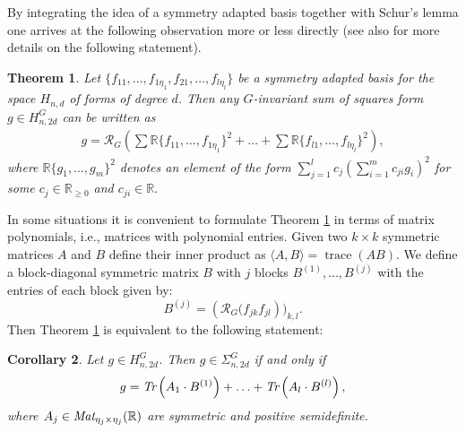 \documentclass[11pt,a4paper]{amsart}
\numberwithin{equation}{section}
\newtheorem{thm}{Theorem}
\newtheorem{cor}[thm]{Corollary}
\theoremstyle{definition}
\newcommand{\R}{\mathbb{R}}
\numberwithin{thm}{section}
\theoremstyle{break}
\numberwithin{subcase}{case}
\begin{document}
By integrating the idea of a symmetry adapted basis together with Schur's lemma one arrives at the following observation more or less directly (see also \cite{blekrie,cimprivc2009sums,gatermann2004symmetry,riener2013exploiting} for more details on  the following statement). 
\begin{thm}\label{THM Decomp}
Let $\{f_{11},\ldots,f_{1\eta_1},f_{21},\ldots,f_{l \eta_l}\}$ be a symmetry adapted basis for the space $H_{n,d}$ of forms of degree $d$. Then any $G$-invariant sum of squares form $g \in H_{n,2d}^G$ can be written as \begin{align*}
    g = \mathcal{R}_G \left( \sum \R\{f_{11},\ldots,f_{1 \eta_1} \}^2 + \ldots + \sum \R \{f_{l1},\ldots,f_{l \eta_l}\}^2 \right), 
    \end{align*}
where $\R\{ g_1,\ldots,g_m\}^2$ denotes an element of the form $\sum_{j=1}^l c_j\left(\sum_{i=1}^m c_{ji}g_i \right)^2$ for some $c_j \in \R_{\geq 0}$ and $c_{ji} \in \R.$\end{thm}

In some situations it is convenient to formulate Theorem \ref{THM Decomp} in terms of matrix polynomials, i.e., matrices with polynomial entries. Given two $k\times k$ symmetric matrices $A$ and $B$ define their inner product as $\langle A,B \rangle=\operatorname{trace}(AB).$ 
We define a block-diagonal symmetric matrix $B$ with $j$ blocks $B^{(1)},\dots,B^{(j)}$ with the entries of each block given by:
\begin{equation}\label{eq:B}
B^{(j)} = \left( \mathcal{R}_G (f_{jk}f_{jl} \right))_{k,l} .
\end{equation}
Then Theorem \ref{THM Decomp} is equivalent to the following statement:
\begin{cor} \label{cor:sos}
Let $g \in H_{n,2d}^G$. Then $g \in \Sigma_{n,2d}^G$ if and only if \begin{align*}
    g = \emph{Tr} \left( A_1 \cdot B^{(1)} \right) + \ldots + \emph{Tr} \left( A_l \cdot B^{(l)} \right),
\end{align*}
where $A_j \in \emph{Mat}_{\eta_j \times \eta_j}(\R)$ are symmetric and positive semidefinite.
\end{cor}
\end{document}
